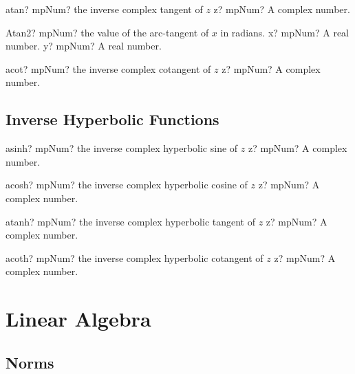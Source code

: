 \documentclass[12pt,a4paper,openany]{book}
\begin{document}
\begin{mpFunctionsExtract}
\mpFunctionOne
{atan? mpNum? the inverse complex tangent of $z$}
{z? mpNum? A complex number.}
\end{mpFunctionsExtract}

\begin{mpFunctionsExtract}
\mpFunctionTwo
{Atan2? mpNum? the value of the arc-tangent of $x$ in radians.}
{x? mpNum? A real number.}
{y? mpNum? A real number.}
\end{mpFunctionsExtract}

\begin{mpFunctionsExtract}
\mpFunctionOne
{acot? mpNum? the inverse complex cotangent of $z$}
{z? mpNum? A complex number.}
\end{mpFunctionsExtract}

\section{Inverse Hyperbolic Functions}

\begin{mpFunctionsExtract}
\mpFunctionOne
{asinh? mpNum? the inverse complex hyperbolic sine of $z$}
{z? mpNum? A complex number.}
\end{mpFunctionsExtract}

\begin{mpFunctionsExtract}
\mpFunctionOne
{acosh? mpNum? the inverse complex hyperbolic cosine of $z$}
{z? mpNum? A complex number.}
\end{mpFunctionsExtract}

\begin{mpFunctionsExtract}
\mpFunctionOne
{atanh? mpNum? the inverse complex hyperbolic tangent of $z$}
{z? mpNum? A complex number.}
\end{mpFunctionsExtract}

\begin{mpFunctionsExtract}
\mpFunctionOne
{acoth? mpNum? the inverse complex hyperbolic cotangent of $z$}
{z? mpNum? A complex number.}
\end{mpFunctionsExtract}

\chapter{Linear Algebra}

\section{Norms}
\end{document}
